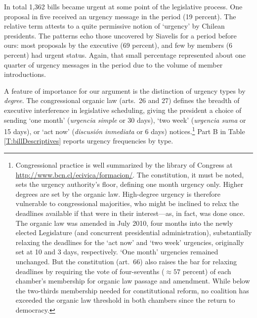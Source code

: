 \documentclass[letter,12pt]{article}
\begin{document}
In total 1,362 bills became urgent at some point of the legislative process. One proposal in five received an urgency message in the period (19 percent). The relative term attests to a quite permissive notion of `urgency' by Chilean presidents. The patterns echo those uncovered by Siavelis for a period before ours: most proposals by the executive (69 percent), and few by members (6 percent) had urgent status. Again, that small percentage represented about one quarter of urgency messages in the period due to the volume of member introductions. 

A feature of importance for our argument is the distinction of urgency types by \emph{degree}. The congressional organic law (arts.\ 26 and 27) defines the breadth of executive interference in legislative scheduling, giving the president a choice of sending `one month' (\emph{urgencia simple} or 30 days), `two week' (\emph{urgencia suma} or 15 days), or `act now' (\emph{discusión inmediata} or 6 days) notices.\footnote{Congressional practice is well summarized by the library of Congress at \url{http://www.bcn.cl/ecivica/formacion/}. The constitution, it must be noted, sets the urgency authority's floor, defining one month urgency only. Higher degrees are set by the organic law. High-degree urgency is therefore vulnerable to congressional majorities, who might be inclined to relax the deadlines available if that were in their interest---as, in fact, was done once. The organic law was amended in July 2010, four months into the newly elected Legislature (and concurrent presidential administration), substantially relaxing the deadlines for the `act now' and `two week' urgencies, originally set at 10 and 3 days, respectively. `One month' urgencies remained unchanged. But the constitution (art.~66) also raises the bar for relaxing deadlines by requiring the vote of four-sevenths ($\approx 57$ percent) of each chamber's membership for organic law passage and amendment. While below the two-thirds membership needed for constitutional reform, no coalition has exceeded the organic law threshold in both chambers since the return to democracy.} Part B in Table \ref{T:billDescriptives} reports urgency frequencies by type.
\end{document}

